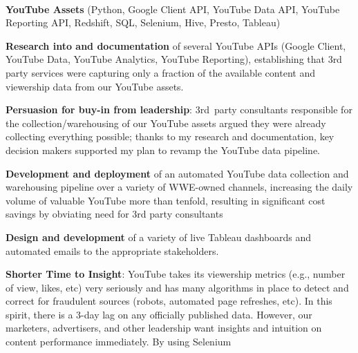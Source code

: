  \\
\begin{itemize*}
  \item\leftandright
    {\textbf{YouTube Assets}}
    {\small{(Python, Google Client API, YouTube Data API, YouTube
    Reporting API, Redshift, SQL, Selenium, Hive, Presto, Tableau)}}
    \begin{itemize*}
      \item \textbf{Research into and documentation} of several YouTube APIs
        (Google Client, YouTube Data, YouTube Analytics, YouTube
        Reporting), establishing that 3rd party services were capturing 
        only a fraction of the available content and viewership data from 
        our YouTube assets.  
      \item \textbf{Persuasion for buy-in from leadership}:  3rd party
        consultants responsible for the collection/warehousing of
        our YouTube assets argued they were already 
        collecting everything possible; thanks to my
        research and documentation, key decision makers supported my 
        plan to revamp the YouTube data pipeline.
      \item \textbf{Development and deployment} of an        
        automated YouTube data collection and warehousing pipeline 
        over a variety of WWE-owned channels, increasing the daily volume of
        valuable YouTube  more than tenfold, resulting in significant 
        cost savings by obviating need for 3rd party consultants
      \item \textbf{Design and development} of a variety of
        live Tableau dashboards and automated emails to the appropriate
        stakeholders.
      \item \textbf{Shorter Time to Insight}: YouTube takes its viewership metrics
        (e.g., number of view, likes, etc) very seriously and has many
        algorithms in place to detect and correct for fraudulent sources
        (robots, automated page refreshes, etc).  In this spirit, there
        is a 3-day lag on any officially published data.  However, our
        marketers, advertisers, and other leadership want insights and
        intuition on content performance immediately.  By using Selenium

\end{itemize*}
\end{itemize*}

